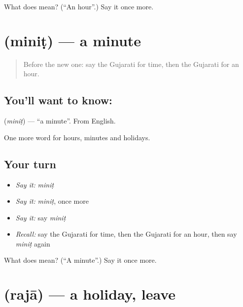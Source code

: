 \begin{tcolorbox}[breakable,colback=teal!4,colframe=teal!35!black,title={Before you move on}]
What does  mean? (\textquotedblleft{}An hour\textquotedblright{}.) Say it once more.
\end{tcolorbox}
\section[\texorpdfstring{\gu{મિનિટ} (miniṭ)}{મિનિટ (miniṭ)}]{ (miniṭ) — a minute}

\label{lesson:GU-C80-minute}



\begin{quote}
Before the new one: say the Gujarati for time, then the Gujarati for an hour.
\end{quote}

\subsection*{You'll want to know: }
\textbf{} (\emph{miniṭ}) — \textquotedblleft{}a minute\textquotedblright{}. From English.

\begin{grammarlens}[title={What you've built}]
One more word for hours, minutes and holidays.
\end{grammarlens}

\subsection*{Your turn}
\begin{itemize}
\raggedright
  \item \emph{Say it:} \emph{miniṭ}
  \item \emph{Say it:} \emph{miniṭ}, once more
  \item \emph{Say it:} say \emph{miniṭ}
  \item \emph{Recall:} say the Gujarati for time, then the Gujarati for an hour, then say \emph{miniṭ} again
\end{itemize}

\begin{tcolorbox}[breakable,colback=teal!4,colframe=teal!35!black,title={Before you move on}]
What does  mean? (\textquotedblleft{}A minute\textquotedblright{}.) Say it once more.
\end{tcolorbox}
\section[\texorpdfstring{\gu{રજા} (rajā)}{રજા (rajā)}]{ (rajā) — a holiday, leave}

